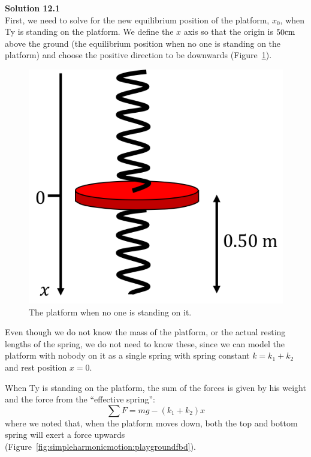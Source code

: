 \begin{framed}
\textbf{Solution 12.1}\\
First, we need to solve for the new equilibrium position of the platform, $x_0$, when Ty is standing on the platform. We define the $x$ axis so that the origin is $50 {\rm cm}$ above the ground (the equilibrium position when no one is standing on the platform) and choose the positive direction to be downwards (Figure~\ref{fig:simpleharmonicmotion:playground2}).

\begin{figure}[!htbp]
\centering
\includegraphics[width=0.35\linewidth]{files/playground2-736b77ec8dd366bba14b67d50562b83e.png}
\caption[]{The platform when no one is standing on it.}
\label{fig:simpleharmonicmotion:playground2}
\end{figure}

Even though we do not know the mass of the platform, or the actual resting lengths of the spring, we do not need to know these, since we can model the platform with nobody on it as a single spring with spring constant $k=k_1+k_2$ and rest position $x=0$.

When Ty is standing on the platform, the sum of the forces is given by his weight and the force from the ``effective spring'':
\begin{equation}
\sum F=mg-(k_1+k_2)x
\end{equation}
where we noted that, when the platform moves down, both the top and bottom spring will exert a force upwards (Figure~\ref{fig:simpleharmonicmotion:playgroundfbd}).


\end{framed}
